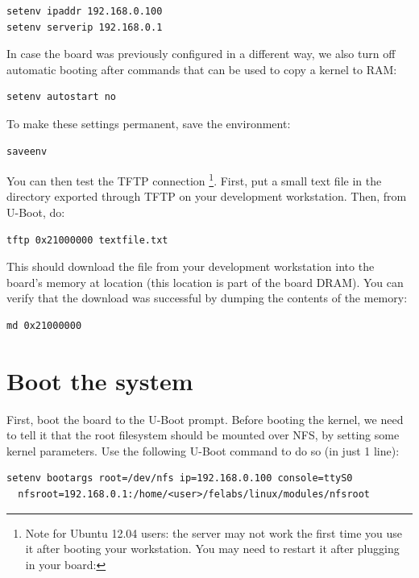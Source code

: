 \begin{verbatim}
setenv ipaddr 192.168.0.100
setenv serverip 192.168.0.1
\end{verbatim}

In case the board was previously configured in a different way, we
also turn off automatic booting after commands that can be used to
copy a kernel to RAM:

\begin{verbatim}
setenv autostart no
\end{verbatim}

To make these settings permanent, save the environment:

\begin{verbatim}
saveenv
\end{verbatim}

You can then test the TFTP connection
\footnote{Note for Ubuntu 12.04 users: the 
server may not work the first time you use it after booting your 
workstation. You may need to restart it after plugging in your board: 
}.
First, put a small text file in
the directory exported through TFTP on your development
workstation. Then, from U-Boot, do:

\begin{verbatim}
tftp 0x21000000 textfile.txt
\end{verbatim}

This should download the file  from your development
workstation into the board's memory at location  (this
location is part of the board DRAM). You can verify that the download
was successful by dumping the contents of the memory:

\begin{verbatim}
md 0x21000000
\end{verbatim}

\section{Boot the system}

First, boot the board to the U-Boot prompt.  Before booting the
kernel, we need to tell it that the root filesystem should be mounted
over NFS, by setting some kernel parameters.  Use the following U-Boot
command to do so (in just 1 line):

\scriptsize
\begin{verbatim}
setenv bootargs root=/dev/nfs ip=192.168.0.100 console=ttyS0
  nfsroot=192.168.0.1:/home/<user>/felabs/linux/modules/nfsroot
\end{verbatim}
\normalsize


